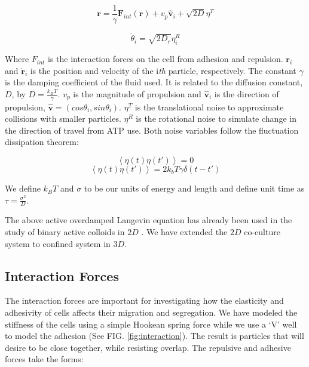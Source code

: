 \documentclass[aps,prb,twocolumn,groupedaddress,nofootinbib,floatfix]{revtex4}
\begin{document}
\begin{equation}
  \bm{\dot{r}} = \frac{1}{\gamma}\bm{F}_{int}(\bm{r}) + v_p\hat{\bm{v}}_i+\sqrt{2D}\eta^T
\end{equation}

\begin{equation}
  \dot{\theta}_i=\sqrt{2D_r}\eta^R_i
\end{equation}

Where $F_{int}$ is the interaction forces on the cell from adhesion and repulsion.
$\bm{r}_i$ and $\dot{\bm{r}}_i$ is the position and velocity of the i\textit{th} particle, respectively.
The constant $\gamma$ is the damping coefficient of the fluid used. It is related to the
diffusion constant, $D$, by $D=\frac{k_BT}{\gamma}$. $v_p$ is the magnitude of propulsion
and $\bm{\hat{v}}_i$ is the direction of propulsion, $\bm{\hat{v}}=(cos\theta_i, sin\theta_i)$.
$\eta^T$ is the translational noise to approximate collisions with smaller particles.
$\eta^R$ is the rotational noise to simulate change in the direction of travel 
from ATP use. Both noise variables follow the fluctuation dissipation theorem:

\begin{equation}
\left\langle \eta(t)\eta(t')\right\rangle = 0 
\end{equation}
\begin{equation}
\left\langle \eta(t)\eta(t')\right\rangle = 2k_bT\gamma
\delta(t-t')
\end{equation}


We define $k_BT$ and $\sigma$ to be our units of energy and length and define 
unit time as $\tau = \frac{\sigma^2}{D}$.

The above active overdamped Langevin equation \cite{RednerBaskaran,FilyMarchetti} has already been used in the study of binary active colloids in $2D$ \cite{Butcher}. 
We have extended the $2D$ co-culture system to confined system in $3D$.


\subsection*{Interaction Forces}

The interaction forces are important for investigating how the elasticity and adhesivity of cells affects their migration and segregation. We have modeled the stiffness of the cells using a simple Hookean spring force while we use a `V' well to model the adhesion (See FIG. \ref{fig:interaction}). The result is particles that will desire to be close together, while resisting overlap. The repulsive and adhesive forces take the forms:
\end{document}
